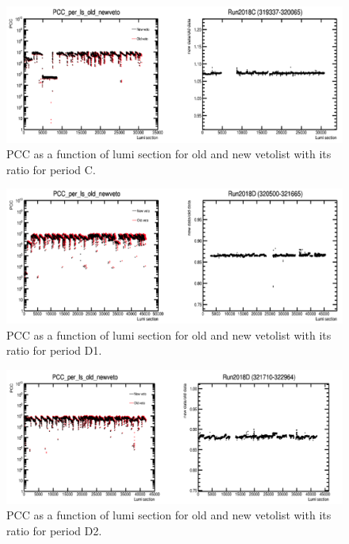 \begin{figure}[!htp]
\centering
\includegraphics[width=1\textwidth]{ashish_thesis/Run2018C_old_new_veto.png}
\caption{%
    PCC as a function of lumi section for old and new vetolist with its ratio for period C.
}
\label{fig:old_new_veto_C}
\end{figure}


\begin{figure}[!htp]
\centering
\includegraphics[width=1\textwidth]{ashish_thesis/Run2018D1_old_new_veto.png}
\caption{%
    PCC as a function of lumi section for old and new vetolist with its ratio for period D1.
}
\label{fig:old_new_veto_D1}
\end{figure}

\begin{figure}[!htp]
\centering
\includegraphics[width=1\textwidth]{ashish_thesis/Run2018D2_old_new_veto.png}
\caption{%
   PCC as a function of lumi section for old and new vetolist with its ratio for period D2.
}
\label{fig:old_new_veto_D2}
\end{figure}

